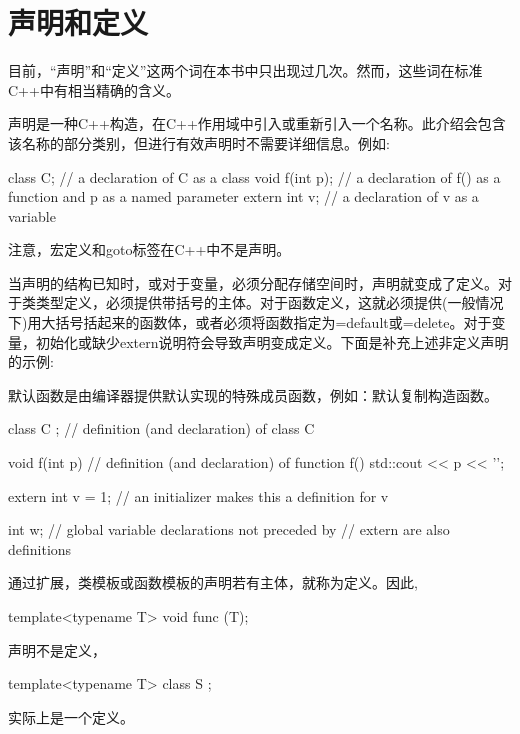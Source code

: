 \section{声明和定义}

目前，“声明”和“定义”这两个词在本书中只出现过几次。然而，这些词在标准C++中有相当精确的含义。

声明是一种C++构造，在C++作用域中引入或重新引入一个名称。此介绍会包含该名称的部分类别，但进行有效声明时不需要详细信息。例如:

\begin{cpp}
class C; // a declaration of C as a class
void f(int p); // a declaration of f() as a function and p as a named parameter
extern int v; // a declaration of v as a variable
\end{cpp}

注意，宏定义和goto标签在C++中不是声明。

当声明的结构已知时，或对于变量，必须分配存储空间时，声明就变成了定义。对于类类型定义，必须提供带括号的主体。对于函数定义，这就必须提供(一般情况下)用大括号括起来的函数体，或者必须将函数指定为=default或=delete。对于变量，初始化或缺少extern说明符会导致声明变成定义。下面是补充上述非定义声明的示例:

\begin{notice}
默认函数是由编译器提供默认实现的特殊成员函数，例如：默认复制构造函数。
\end{notice}

\begin{cpp}
class C {}; // definition (and declaration) of class C

void f(int p) { // definition (and declaration) of function f()
	std::cout << p << ’\n’;
}

extern int v = 1; // an initializer makes this a definition for v

int w; // global variable declarations not preceded by
// extern are also definitions
\end{cpp}

通过扩展，类模板或函数模板的声明若有主体，就称为定义。因此,

\begin{cpp}
template<typename T>
void func (T);
\end{cpp}

声明不是定义，

\begin{cpp}
template<typename T>
class S {};
\end{cpp}

实际上是一个定义。

